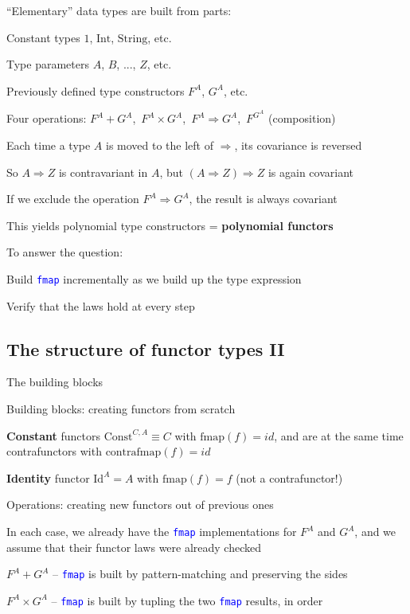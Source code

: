 ``Elementary'' data types are built from parts:

Constant types $1$, $\text{Int}$, $\text{String}$, etc.

Type parameters $A$, $B$, ..., $Z$, etc.

Previously defined type constructors $F^{A}$, $G^{A}$, etc.

Four operations: $F^{A}+G^{A}$,\  $F^{A}\times G^{A}$,\  $F^{A}\Rightarrow G^{A}$,\ 
$F^{G^{A}}$ (composition)

Each time a type $A$ is moved to the left of $\Rightarrow$, its
covariance is reversed

So $A\Rightarrow Z$ is contravariant in $A$, but $\left(A\Rightarrow Z\right)\Rightarrow Z$
is again covariant

If we exclude the operation $F^{A}\Rightarrow G^{A}$, the result
is always covariant

This yields polynomial type constructors = \textbf{polynomial functors}

To answer the question:

Build \texttt{\textcolor{blue}{\footnotesize{}fmap}} incrementally
as we build up the type expression

Verify that the laws hold at every step


\subsection{The structure of functor types II}

The building blocks

Building blocks: creating functors from scratch

\textbf{Constant} functors $\text{Const}^{C,A}\equiv C$ with $\text{fmap}(f)=id$,
and are at the same time contrafunctors with $\text{contrafmap}(f)=id$

\textbf{Identity} functor $\text{Id}^{A}=A$ with $\text{fmap}(f)=f$
(not a contrafunctor!)

Operations: creating new functors out of previous ones

In each case, we already have the \texttt{\textcolor{blue}{\footnotesize{}fmap}}
implementations for $F^{A}$ and $G^{A}$, and we assume that their
functor laws were already checked 

$F^{A}+G^{A}$ – \texttt{\textcolor{blue}{\footnotesize{}fmap}} is
built by pattern-matching and preserving the sides

$F^{A}\times G^{A}$ – \texttt{\textcolor{blue}{\footnotesize{}fmap}}
is built by tupling the two \texttt{\textcolor{blue}{\footnotesize{}fmap}}
results, in order

